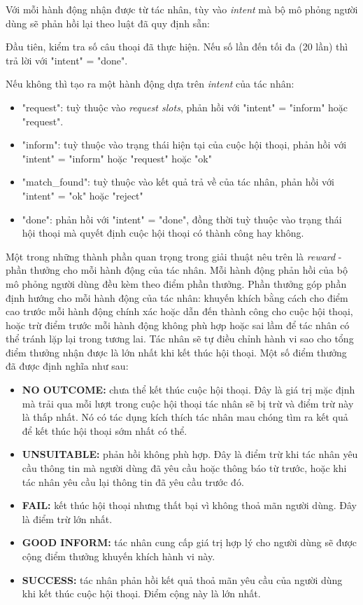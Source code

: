Với mỗi hành động nhận được từ tác nhân, tùy vào \textit{intent} mà bộ mô phỏng người dùng sẽ phản hồi lại theo luật đã quy định sẵn:

Đầu tiên, kiểm tra số câu thoại đã thực hiện. Nếu số lần đến tối đa (20 lần) thì trả lời với "intent" = "done".

Nếu không thì tạo ra một hành động dựa trên \textit{intent} của tác nhân:

\begin{itemize}
    \item "request": tuỳ thuộc vào \textit{request slots}, phản hồi với "intent" = "inform" hoặc "request".
    \item "inform": tuỳ thuộc vào trạng thái hiện tại của cuộc hội thoại, phản hồi với "intent" = "inform" hoặc "request" hoặc "ok"
    \item "match\_found": tuỳ thuộc vào kết quả trả về của tác nhân, phản hồi với "intent" = "ok" hoặc "reject"
    \item "done": phản hồi với "intent" = "done", đồng thời tuỳ thuộc vào trạng thái hội thoại mà quyết định cuộc hội thoại có thành công hay không.
\end{itemize}

Một trong những thành phần quan trọng trong giải thuật nêu trên là \textit{reward} - phần thưởng cho mỗi hành động của tác nhân. Mỗi hành động phản hồi của bộ mô phỏng người dùng đều kèm theo điểm phần thưởng. Phần thưởng góp phần định hướng cho mỗi hành động của tác nhân: khuyến khích bằng cách cho điểm cao trước mỗi hành động chính xác hoặc dẫn đến thành công cho cuộc hội thoại, hoặc trừ điểm trước mỗi hành động không phù hợp hoặc sai lầm để tác nhân có thể tránh lặp lại trong tương lai. Tác nhân sẽ tự điều chỉnh hành vi sao cho tổng điểm thưởng nhận được là lớn nhất khi kết thúc hội thoại. Một số điểm thưởng đã được định nghĩa như sau:

\begin{itemize}
    \item \textbf{NO OUTCOME:} chưa thể kết thúc cuộc hội thoại. Đây là giá trị mặc định mà trải qua mỗi lượt trong cuộc hội thoại tác nhân sẽ bị trừ và điểm trừ này là thấp nhất. Nó có tác dụng kích thích tác nhân mau chóng tìm ra kết quả để kết thúc hội thoại sớm nhất có thể.
    \item \textbf{UNSUITABLE:} phản hồi không phù hợp. Đây là điểm trừ khi tác nhân yêu cầu thông tin mà người dùng đã yêu cầu hoặc thông báo từ trước, hoặc khi tác nhân yêu cầu lại thông tin đã yêu cầu trước đó.
    \item \textbf{FAIL:} kết thúc hội thoại nhưng thất bại vì không thoả mãn người dùng. Đây là điểm trừ lớn nhất.
    \item \textbf{GOOD INFORM:} tác nhân cung cấp giá trị hợp lý cho người dùng sẽ được cộng điểm thưởng khuyến khích hành vi này.
    \item \textbf{SUCCESS:} tác nhân phản hồi kết quả thoả mãn yêu cầu của người dùng khi kết thúc cuộc hội thoại. Điểm cộng này là lớn nhất.
\end{itemize}

